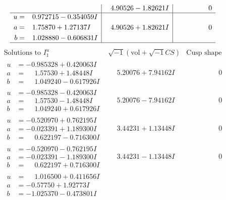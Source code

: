\documentclass[1p]{elsarticle_modified}
\theoremstyle{definition}
\newcommand{\I}{\sqrt{-1}}
\begin{document}
$$\begin{array}{c|c|c}
 & \phantom{-}4.90526 - 1.82621 I & \phantom{-0.000000 } 0 \\ \hline\begin{aligned}
u &= \phantom{-}0.972715 - 0.354059 I \\
a &= \phantom{-}1.75870 + 1.27137 I \\
b &= \phantom{-}1.028880 - 0.606831 I\end{aligned}
 & \phantom{-}4.90526 + 1.82621 I & \phantom{-0.000000 } 0\\
 \hline 
 \end{array}$$\newpage$$\begin{array}{c|c|c}  
\text{Solutions to }I^u_{1}& \I (\text{vol} + \sqrt{-1}CS) & \text{Cusp shape}\\
 \hline 
\begin{aligned}
u &= -0.985328 + 0.420063 I \\
a &= \phantom{-}1.57530 + 1.48448 I \\
b &= \phantom{-}1.049240 - 0.617926 I\end{aligned}
 & \phantom{-}5.20076 + 7.94162 I & \phantom{-0.000000 } 0 \\ \hline\begin{aligned}
u &= -0.985328 - 0.420063 I \\
a &= \phantom{-}1.57530 - 1.48448 I \\
b &= \phantom{-}1.049240 + 0.617926 I\end{aligned}
 & \phantom{-}5.20076 - 7.94162 I & \phantom{-0.000000 } 0 \\ \hline\begin{aligned}
u &= -0.520970 + 0.762195 I \\
a &= -0.023391 + 1.189300 I \\
b &= \phantom{-}0.622197 - 0.716300 I\end{aligned}
 & \phantom{-}3.44231 + 1.13448 I & \phantom{-0.000000 } 0 \\ \hline\begin{aligned}
u &= -0.520970 - 0.762195 I \\
a &= -0.023391 - 1.189300 I \\
b &= \phantom{-}0.622197 + 0.716300 I\end{aligned}
 & \phantom{-}3.44231 - 1.13448 I & \phantom{-0.000000 } 0 \\ \hline\begin{aligned}
u &= \phantom{-}1.016500 + 0.411656 I \\
a &= -0.57750 + 1.92773 I \\
b &= -1.025370 - 0.473801 I\end{aligned}

\end{array}$$
\end{document}
